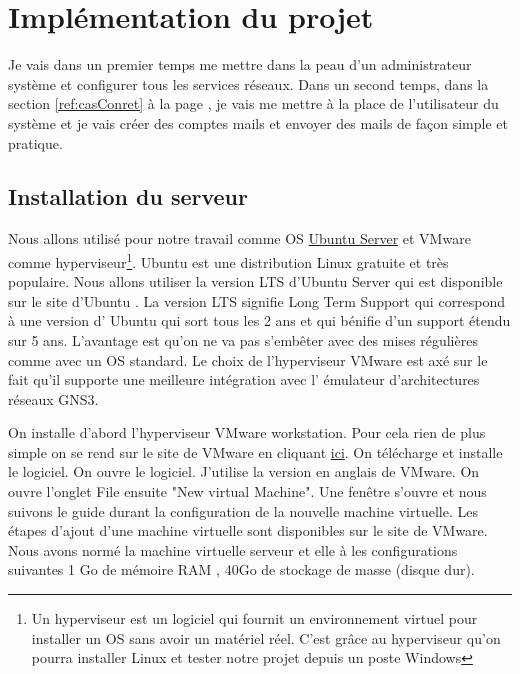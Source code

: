 \documentclass[a4paper,12pt,french]{report} %
\begin{document}
\chapter{Implémentation du projet}
Je vais dans un premier temps me mettre dans la peau d'un administrateur système et configurer tous les services réseaux. Dans un second temps, dans la section \ref{ref:casConret} à la page \pageref{ref:casConret}, je vais me mettre à la place de l'utilisateur du système et je vais créer des comptes mails et envoyer des mails de façon simple et pratique. 
\section{Installation du serveur}
Nous allons utilisé pour notre travail comme OS \href{https://ubuntu-fr.org/telechargement?variante=server}{Ubuntu Server} et VMware comme hyperviseur\footnote{Un hyperviseur est un logiciel qui fournit un environnement virtuel pour installer un OS sans avoir un matériel réel. C'est grâce au hyperviseur qu'on pourra installer Linux et tester notre projet depuis un poste Windows}. Ubuntu est une distribution Linux gratuite et très populaire. Nous allons utiliser la version  LTS d'Ubuntu Server qui est disponible sur le site d'Ubuntu . La version LTS signifie Long Term Support qui correspond à une version d' Ubuntu qui sort tous les 2 ans et qui bénifie d'un support étendu sur 5 ans. L'avantage est qu'on ne va pas s'embêter avec des mises régulières comme avec un OS standard. Le choix de l'hyperviseur VMware est axé sur le fait qu'il supporte une meilleure intégration avec l' émulateur d'architectures réseaux GNS3.%

	On installe d'abord l'hyperviseur VMware workstation. Pour cela rien de plus simple on se rend sur le site de VMware en cliquant \href{https://my.vmware.com/en/web/vmware/free}{ici}. On télécharge et installe le logiciel. On ouvre le logiciel. J'utilise la version en anglais de VMware. On ouvre l'onglet File ensuite "New virtual Machine". Une fenêtre s'ouvre et nous suivons le guide durant la configuration de la nouvelle machine virtuelle. Les étapes d'ajout d'une machine virtuelle sont disponibles sur le site de VMware. Nous avons normé la machine virtuelle serveur et elle à les configurations suivantes 1 Go de mémoire RAM , 40Go de stockage de masse (disque dur).
\end{document}

